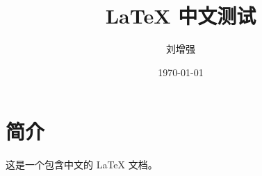 \documentclass{article}
\begin{document}
\title{LaTeX 中文测试}
\author{刘增强}
\date{\today}
\maketitle

\section{简介}
这是一个包含中文的 LaTeX 文档。
\end{document}

